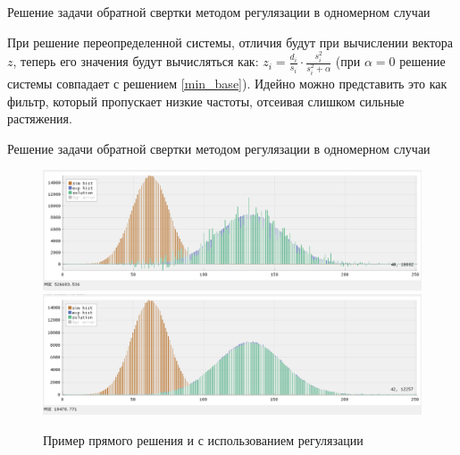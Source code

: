 \documentclass[fullscreen=true,russian,compress,%
	hyperref={unicode,bookmarks=false}]{presentation}
\begin{document}
\begin{frame}{Решение задачи обратной свертки методом регулязации в одномерном случаи}

При решение переопределенной системы, отличия будут при вычислении вектора $z$, теперь его значения будут вычисляться как:
$z_{i} = \frac{d_{i}}{s_{i}} \cdot \frac{s^2_{i}}{s^2_{i} + \alpha}$ (при $\alpha = 0$ решение системы
совпадает с решением \eqref{min_base}). Идейно можно представить это как фильтр, который пропускает низкие частоты, отсеивая слишком 
сильные растяжения.

\end{frame}

\begin{frame}{Решение задачи обратной свертки методом регулязации в одномерном случаи}
   \begin{figure}[h]
      \includegraphics[width=\linewidth]{images/example_without_regulazation.png}
      \includegraphics[width=\linewidth]{images/example_regulazation.png}
      \caption{Пример прямого решения и с использованием регулязации}
   \end{figure}
\end{frame}
\end{document}
